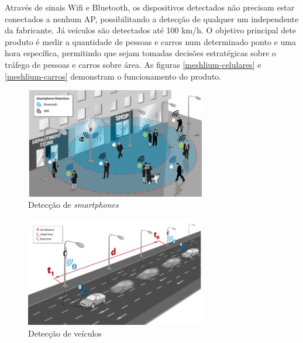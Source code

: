 Através de sinais Wifi e Bluetooth, os dispositivos detectados não precisam
estar conectados a nenhum AP, possibilitando a detecção de qualquer um
independente da fabricante. Já veículos são detectados até 100 km/h. O objetivo
principal dete produto é medir a quantidade de pessoas e carros num determinado
ponto e uma hora específica, permitindo que sejam tomadas decisões estratégicas
sobre o tráfego de pessoas e carros sobre área. As figuras
\autoref{meshlium-celulares} e \autoref{meshlium-carros} demonstram o
funcionamento do produto.

\begin{figure}[htb]
  \caption{\label{meshlium-celulares}Detecção de \emph{smartphones}}
  \begin{center}
    \includegraphics[width=0.70\textwidth]{img/meshlium-celulares.png}
  \end{center}
\end{figure}

\begin{figure}[htb]
  \caption{\label{meshlium-carros}Detecção de veículos}
  \begin{center}
    \includegraphics[width=0.70\textwidth]{img/meshlium-carros.png}
  \end{center}
\end{figure}
